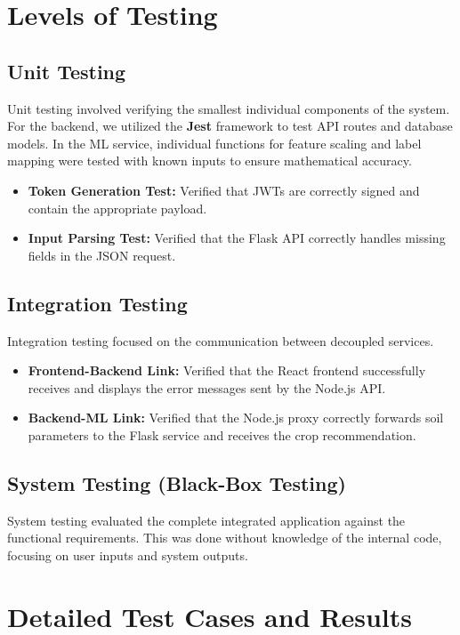 \documentclass[12pt,a4paper]{report}
\begin{document}
\section{Levels of Testing}

\subsection{Unit Testing}
Unit testing involved verifying the smallest individual components of the system. For the backend, we utilized the \textbf{Jest} framework to test API routes and database models. In the ML service, individual functions for feature scaling and label mapping were tested with known inputs to ensure mathematical accuracy.
\begin{itemize}
    \item \textbf{Token Generation Test:} Verified that JWTs are correctly signed and contain the appropriate payload.
    \item \textbf{Input Parsing Test:} Verified that the Flask API correctly handles missing fields in the JSON request.
\end{itemize}

\subsection{Integration Testing}
Integration testing focused on the communication between decoupled services.
\begin{itemize}
    \item \textbf{Frontend-Backend Link:} Verified that the React frontend successfully receives and displays the error messages sent by the Node.js API.
    \item \textbf{Backend-ML Link:} Verified that the Node.js proxy correctly forwards soil parameters to the Flask service and receives the crop recommendation.
\end{itemize}

\subsection{System Testing (Black-Box Testing)}
System testing evaluated the complete integrated application against the functional requirements. This was done without knowledge of the internal code, focusing on user inputs and system outputs.

\section{Detailed Test Cases and Results}
\end{document}
